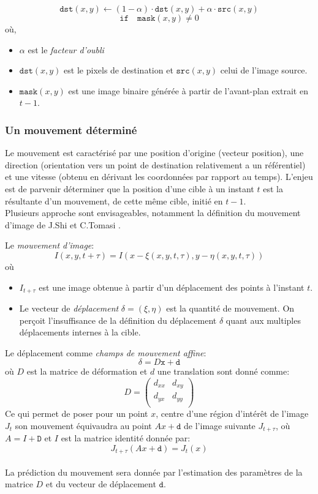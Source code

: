 \documentclass[a4paper,12pt]{report}
\begin{document}
	$$\texttt{dst}(x,y)  \leftarrow (1- \alpha )  \cdot \texttt{dst}(x,y)+\alpha \cdot \texttt{src}(x,y)$$
	$$\texttt{if} \quad \texttt{mask} (x,y)  \ne 0$$
	où,	
	\begin{itemize}
	\item[] $\alpha$ est le \textit{facteur d'oubli}
	\item[] $\texttt{dst}(x,y)$ est le pixels de destination et $\texttt{src}(x,y)$ celui de l'image source.
	\item[] $\texttt{mask} (x,y)$ est une image binaire générée à partir de l'avant-plan extrait en $t-1$.
	\end{itemize}
	
	
	

\subsubsection{Un mouvement déterminé}		
	Le mouvement est caractérisé par une position d'origine (vecteur position), une direction (orientation vers un point de destination relativement a un référentiel) et une vitesse (obtenu en dérivant les coordonnées par rapport au temps).	
	L'enjeu est de parvenir déterminer que la position d'une cible à un instant $t$ est la résultante d'un mouvement, de cette même cible, initié en $t-1$.\\
	
	Plusieurs approche sont envisageables, notamment la définition du mouvement d'image de J.Shi et C.Tomasi .
	
	Le \textit{mouvement d'image}:
	$$I(x,y,t+\tau)=I(x-\xi(x,y,t,\tau),y-\eta(x,y,t,\tau))$$
	où
	\begin{itemize}
	\item[] $I_{t+\tau}$ est une image obtenue à partir d'un déplacement des points à l'instant $t$.
	\item[] Le vecteur de \textit{déplacement} $\delta = (\xi,\eta)$ est la quantité de mouvement. On perçoit l'insuffisance de la définition du déplacement $\delta$ quant aux multiples déplacements internes à la cible.\\
	\end{itemize}
	Le déplacement comme \textit{champs de mouvement affine}:
	$$\delta = D\texttt{x}+\texttt{d}$$
	où
	$D$ est la matrice de déformation et $d$ une translation sont donné comme:
	$$ D = \left( 
		\begin{array}{cc}
		d_{xx} & d_{xy} \\
		d_{yx} & d_{yy} \\ 
		\end{array} 
		   \right)
	$$
	Ce qui permet de poser pour un point $x$, centre d'une région d'intérêt de l'image $J_t$ son mouvement équivaudra au point $Ax + \texttt{d}$ de l'image suivante $J_{t+\tau}$, où $A = I + \texttt{D}$ et $I$ est la matrice identité donnée par:$$J_{t+\tau}(Ax + \texttt{d}) = J_t(x)$$\\
	La prédiction du mouvement sera donnée par l'estimation des paramètres de la matrice $D$ et du vecteur de déplacement $\texttt{d}$.\\
	
\end{document}
